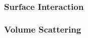 \documentclass{stdlocal}
\begin{document}
    \subsubsection*{Surface Interaction} %
    \label{ssub:surface_interaction}


    \subsubsection*{Volume Scattering} %
    \label{ssub:volume_scattering}

\end{document}
